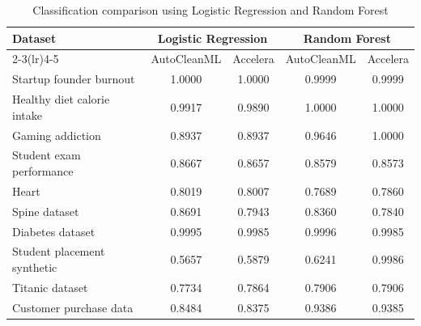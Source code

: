 \documentclass[12pt,a4paper]{report}
\newcommand{\acceleraTableStyle}{%
\small
\renewcommand{\arraystretch}{1.15}
\setlength{\tabcolsep}{4pt}%
}
\begin{document}
\begin{table}[H]
\centering
\acceleraTableStyle
\caption{Classification comparison using Logistic Regression and Random Forest}
\label{tab:classification-lr-rf-autoclean-accelera}
\begin{tabular}{p{}cccc}
\toprule
Dataset & \multicolumn{2}{c}{Logistic Regression} & \multicolumn{2}{c}{Random Forest} \\
\cmidrule(lr){2-3}\cmidrule(lr){4-5}
 & AutoCleanML & Accelera & AutoCleanML & Accelera \\
\midrule
Startup founder burnout & 1.0000 & 1.0000 & 0.9999 & 0.9999 \\
Healthy diet calorie intake & 0.9917 & 0.9890 & 1.0000 & 1.0000 \\
Gaming addiction & 0.8937 & 0.8937 & 0.9646 & 1.0000 \\
Student exam performance & 0.8667 & 0.8657 & 0.8579 & 0.8573 \\
Heart & 0.8019 & 0.8007 & 0.7689 & 0.7860 \\
Spine dataset & 0.8691 & 0.7943 & 0.8360 & 0.7840 \\
Diabetes dataset & 0.9995 & 0.9985 & 0.9996 & 0.9985 \\
Student placement synthetic & 0.5657 & 0.5879 & 0.6241 & 0.9986 \\
Titanic dataset & 0.7734 & 0.7864 & 0.7906 & 0.7906 \\
Customer purchase data & 0.8484 & 0.8375 & 0.9386 & 0.9385 \\
\bottomrule
\end{tabular}
\end{table}
\end{document}
